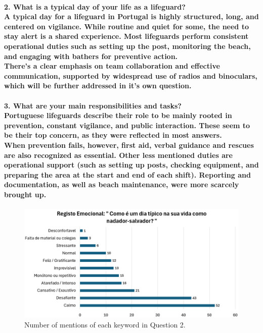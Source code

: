\paragraph{
\textbf{2. What is a typical day of your life as a lifeguard?}
\\
A typical day for a lifeguard in Portugal is highly structured, long, and centered on vigilance. While routine and quiet for some, the need to stay alert is a shared experience. Most lifeguards perform consistent operational duties such as setting up the post, monitoring the beach, and engaging with bathers for preventive action.
\\
There’s a clear emphasis on team collaboration and effective communication, supported by widespread use of radios and binoculars, which will be further addressed in it's own question.}


\paragraph{
\textbf{3. What are your main responsibilities and tasks?}
\\
Portuguese lifeguards describe their role to be mainly rooted in prevention, constant vigilance, and public interaction. These seem to be their top concern, as they were reflected in most answers.
\\
When prevention fails, however, first aid, verbal guidance and rescues are also recognized as essential. Other less mentioned duties are operational support (such as setting up posts, checking equipment, and preparing the area at the start and end of each shift). Reporting and documentation, as well as beach maintenance, were more scarcely brought up.}

\begin{figure}[H]
      \centering
      \includegraphics[width=14cm]{figs/questiongraf/image2.png}
      \caption{Number of mentions of each keyword in Question 2.}
      \label{fig:question2}
\end{figure}


